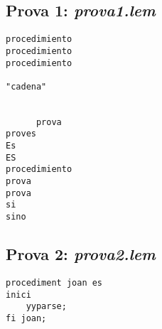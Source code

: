 \documentclass[10pt]{report}
\begin{document}
    \subsection{Prova 1: \textit{prova1.lem}}
    \begin{lstlisting}
procedimiento
procedimiento
procedimiento

"cadena"


      prova
proves
Es
ES
procedimiento
prova
prova
si
sino
    \end{lstlisting}
    \newpage
    
    \subsection{Prova 2: \textit{prova2.lem}}
    \begin{lstlisting}
procediment joan es
inici
    yyparse;
fi joan;
    \end{lstlisting}
\end{document}
